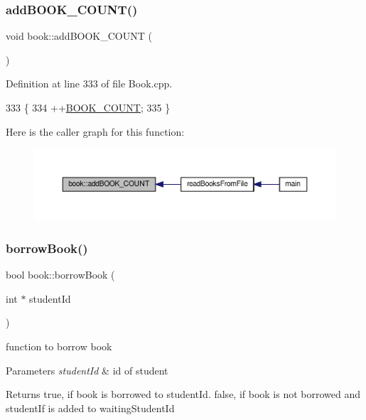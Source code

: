 \subsubsection{\texorpdfstring{add\+B\+O\+O\+K\+\_\+\+C\+O\+U\+N\+T()}{addBOOK\_COUNT()}}
{\footnotesize\ttfamily void book\+::add\+B\+O\+O\+K\+\_\+\+C\+O\+U\+NT (\begin{DoxyParamCaption}{ }\end{DoxyParamCaption})}



Definition at line 333 of file Book.\+cpp.


\begin{DoxyCode}
333                         \{
334     ++\hyperlink{_book_8h_a84e48ab264903213f7f7a264da4e867d}{BOOK\_COUNT};
335 \}
\end{DoxyCode}
Here is the caller graph for this function\+:
\nopagebreak
\begin{figure}[H]
\begin{center}
\leavevmode
\includegraphics[width=350pt]{classbook_a73dd64c834bd70d659ee456f3ef94c05_icgraph}
\end{center}
\end{figure}
\mbox{\label{classbook_a68bc47d79edd93594d50f720be2653f6}} 
\subsubsection{\texorpdfstring{borrow\+Book()}{borrowBook()}}
{\footnotesize\ttfamily bool book\+::borrow\+Book (\begin{DoxyParamCaption}\item[{int $\ast$}]{student\+Id }\end{DoxyParamCaption})}

function to borrow book 
\begin{DoxyParams}{Parameters}
{\em student\+Id} & id of student \\
\hline
\end{DoxyParams}
\begin{DoxyReturn}{Returns}
true, if book is borrowed to student\+Id. false, if book is not borrowed and student\+If is added to waiting\+Student\+Id 
\end{DoxyReturn}


